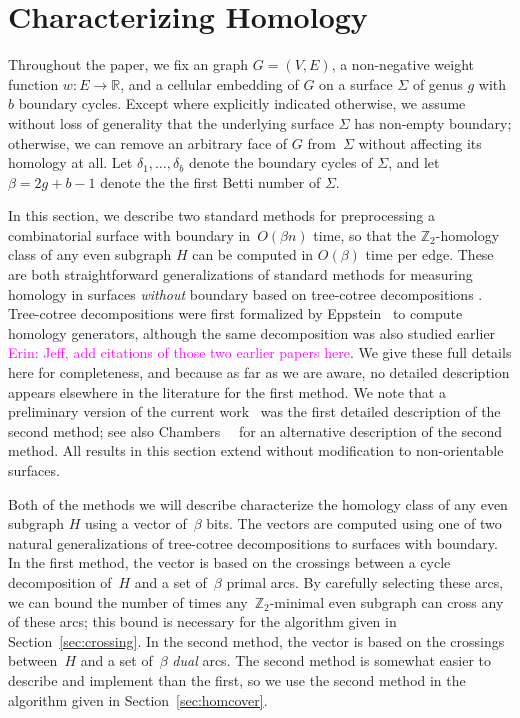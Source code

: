 \documentclass[letterpaper,review]{siamart190516}
\def\Z{\mathbb{Z}}
\def\Real{\mathbb{R}}
\def\enote#1{\textcolor{magenta}{Erin: #1}}
\begin{document}
\section{Characterizing Homology}
\label{S:tree-cotree}

Throughout the paper, we fix an  graph $G=(V,E)$, a non-negative weight function $w\colon E\to \Real$, and a cellular embedding of $G$ on a surface $\Sigma$ of genus $g$ with $b$ boundary cycles.
Except where explicitly indicated otherwise, we assume without loss of generality  that the underlying surface $\Sigma$ has non-empty boundary; otherwise, we can remove an arbitrary face of $G$ from~$\Sigma$ without affecting its homology at all.  Let $\delta_1, \dots, \delta_b$ denote the boundary cycles of $\Sigma$, and let $\beta = 2g+b-1$ denote the the first Betti number of $\Sigma$.

In this section, we describe two standard methods for preprocessing a combinatorial surface with boundary in~$O(\beta n)$ time, so that the $\Z_2$-homology class of any even subgraph $H$ can be computed in $O(\beta)$ time per edge.  These are both straightforward generalizations of standard methods for measuring homology in surfaces \emph{without} boundary based on tree-cotree decompositions \cite{ew-gohhg-05, ccelw-scsih-08, e-dgteg-03}.
Tree-cotree decompositions were first formalized by Eppstein~\cite{e-dgteg-03} to compute homology generators, although the same decomposition was also studied earlier \enote{Jeff, add citations of those two earlier papers here}.
We give these full details here for completeness, and because as far as we are aware, no detailed description appears
elsewhere in the literature for the first method.  We note that a preliminary version of the current
work~\cite{en-mcsnc-11} was the first detailed description of the second method;
see also Chambers~\etal~\cite{bcfn-mchbs-17} for an alternative description of the second method.
All results in this section extend without modification to non-orientable surfaces.


Both of the methods we will describe characterize the homology class of any even subgraph $H$ using a vector of~$\beta$ bits.
The vectors are computed using one of two natural generalizations of tree-cotree decompositions  to surfaces with boundary.
In the first method, the vector is based on the crossings between a cycle decomposition of~$H$ and a set of~$\beta$ primal arcs.
By carefully selecting these arcs, we can bound the number of times any~$\Z_2$-minimal even subgraph can cross any of these arcs; this bound is necessary for the algorithm given in Section~\ref{sec:crossing}.
In the second method, the vector is based on the crossings between~$H$ and a set of~$\beta$ \emph{dual} arcs.
The second method is somewhat easier to describe and implement than the first, so we use the second method in the algorithm given in Section~\ref{sec:homcover}.
\end{document}
